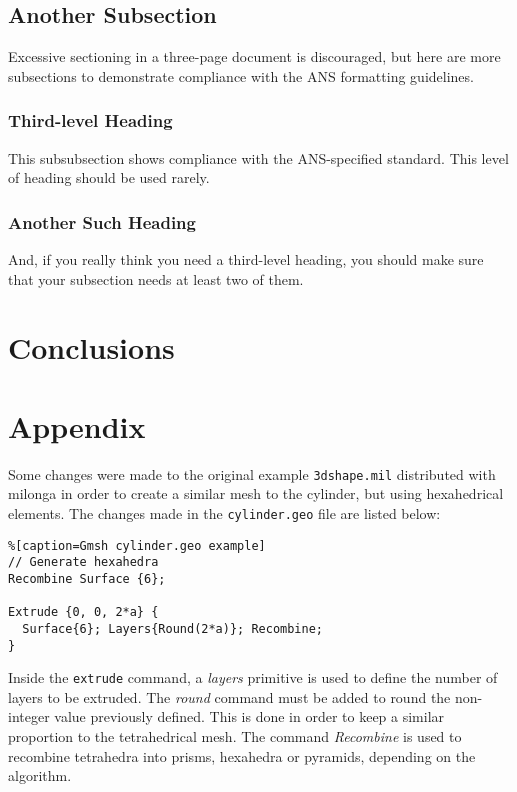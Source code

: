 \documentclass[review]{elsarticle}
\begin{document}
\subsection{Another Subsection}
Excessive sectioning in a three-page document is discouraged, but here are more
subsections to demonstrate compliance with the ANS formatting guidelines.

\subsubsection{Third-level Heading}
This subsubsection shows compliance with the ANS-specified standard. This level
of heading should be used rarely.

\subsubsection{Another Such Heading}
And, if you really think you need a third-level heading, you should make sure
that your subsection needs at least two of them.

\section{Conclusions}

\appendix
\section{Appendix}
\label{Appendix}
Some changes were made to the original example \texttt{3dshape.mil} distributed
with milonga in order to create a similar mesh to the cylinder, but using
hexahedrical elements. The changes made in the \texttt{cylinder.geo} file
are listed below:

\begin{lstlisting}%[caption=Gmsh cylinder.geo example]
// Generate hexahedra
Recombine Surface {6};

Extrude {0, 0, 2*a} {
  Surface{6}; Layers{Round(2*a)}; Recombine;
}
\end{lstlisting}

Inside the \texttt{extrude} command, a \textit{layers} primitive is used to
define the number of layers to be extruded. The \textit{round} command must
be added to round the non-integer value previously defined. This is done
in order to keep a similar proportion to the tetrahedrical mesh. The
command \textit{Recombine} is used to recombine tetrahedra into prisms,
hexahedra or pyramids, depending on the algorithm.
\end{document}
